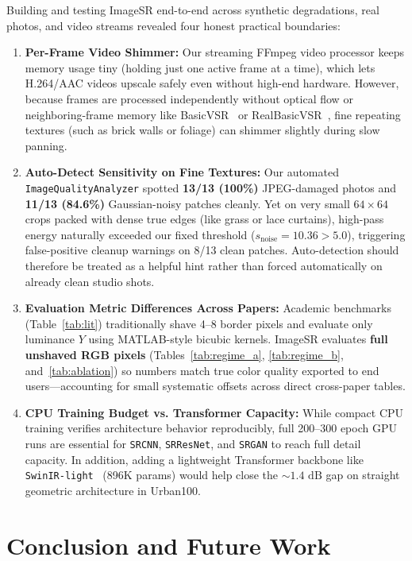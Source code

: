 \documentclass[10pt,onecolumn,journal]{IEEEtran}
\begin{document}
Building and testing ImageSR end-to-end across synthetic degradations, real photos, and video streams revealed four honest practical boundaries:
\begin{enumerate}
    \item \textbf{Per-Frame Video Shimmer:} Our streaming FFmpeg video processor keeps memory usage tiny (holding just one active frame at a time), which lets H.264/AAC videos upscale safely even without high-end hardware. However, because frames are processed independently without optical flow or neighboring-frame memory like BasicVSR~\cite{chan2021basicvsr} or RealBasicVSR~\cite{chan2022realbasicvsr}, fine repeating textures (such as brick walls or foliage) can shimmer slightly during slow panning.
    \item \textbf{Auto-Detect Sensitivity on Fine Textures:} Our automated \texttt{ImageQualityAnalyzer} spotted \textbf{13/13 (100\%)} JPEG-damaged photos and \textbf{11/13 (84.6\%)} Gaussian-noisy patches cleanly. Yet on very small $64\times64$ crops packed with dense true edges (like grass or lace curtains), high-pass energy naturally exceeded our fixed threshold ($s_{\mathrm{noise}} = 10.36 > 5.0$), triggering false-positive cleanup warnings on 8/13 clean patches. Auto-detection should therefore be treated as a helpful hint rather than forced automatically on already clean studio shots.
    \item \textbf{Evaluation Metric Differences Across Papers:} Academic benchmarks (Table~\ref{tab:lit}) traditionally shave 4--8 border pixels and evaluate only luminance $Y$ using MATLAB-style bicubic kernels. ImageSR evaluates \textbf{full unshaved RGB pixels} (Tables~\ref{tab:regime_a}, \ref{tab:regime_b}, and~\ref{tab:ablation}) so numbers match true color quality exported to end users---accounting for small systematic offsets across direct cross-paper tables.
    \item \textbf{CPU Training Budget vs. Transformer Capacity:} While compact CPU training verifies architecture behavior reproducibly, full 200--300 epoch GPU runs are essential for \texttt{SRCNN}, \texttt{SRResNet}, and \texttt{SRGAN} to reach full detail capacity. In addition, adding a lightweight Transformer backbone like \texttt{SwinIR-light}~\cite{liang2021swinir} (896K params) would help close the $\sim1.4\text{ dB}$ gap on straight geometric architecture in Urban100.
\end{enumerate}

\section{Conclusion and Future Work}
\end{document}
